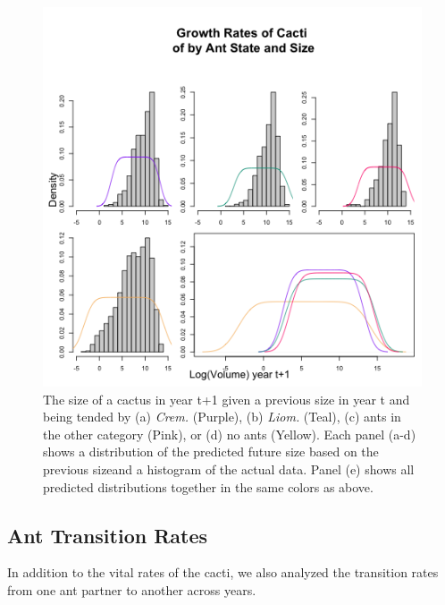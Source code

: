 \documentclass[12pt,a4paper]{article}
\begin{document}
	\begin{figure}[!ht]
	    \centering
	    \includegraphics{Figures/grow_dist_panel2.png}
	    \caption{The size of a cactus in year t+1 given a previous size in year t and being tended by (a) \textit{Crem.} (Purple), (b) \textit{Liom.} (Teal), (c) ants in the other category (Pink), or (d) no ants (Yellow). Each panel (a-d) shows a distribution of the predicted future size based on the previous sizeand a histogram of the actual data. Panel (e) shows all predicted distributions together in the same colors as above.}
	    \label{fig:grow2}
	\end{figure}
	
	\subsection*{Ant Transition Rates}
	
	In addition to the vital rates of the cacti, we also analyzed the transition rates from one ant partner to another across years. 
\end{document}
